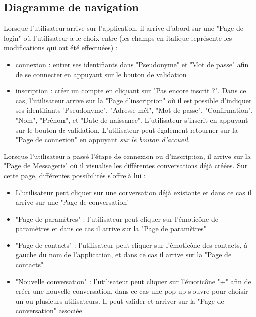 	\newpage

	\subsection{Diagramme de navigation}
	Lorsque l'utilisateur arrive sur l'application, il arrive d'abord sur une "Page de login" où l'utilisateur a le choix entre (les champs en italique représente les modifications qui ont été effectuées) :
	\begin{itemize}
		\item connexion : entrer ses identifiants dans "Pseudonyme" et "Mot de passe" afin de se connecter en appuyant sur le bouton de validation
		\item inscription : créer un compte en cliquant sur "Pas encore inscrit ?".
		Dans ce cas, l'utilisateur arrive sur la "Page d'inscription" où il est possible d'indiquer ses identifiants "Pseudonyme", "Adresse mél", "Mot de passe", "Confirmation", "Nom", "Prénom", et "Date de naissance".
		L'utilisateur s'inscrit en appuyant sur le bouton de validation.
		L'utilisateur peut également retourner sur la "Page de connexion" en appuyant \textit{sur le bouton d'accueil}.\\
	\end{itemize}

	Lorsque l'utilisateur a passé l'étape de connexion ou d'inscription, il arrive sur la "Page de Messagerie" où il visualise les différentes conversations déjà créées. Sur cette page, différentes possibilités s'offre à lui :
	\begin{itemize}
		\item L'utilisateur peut cliquer sur une conversation déjà existante et dans ce cas il arrive sur une "Page de conversation"
		\item "Page de paramètres" : l'utilisateur peut cliquer sur l’émoticône de paramètres et dans ce cas il arrive sur la "Page de paramètres"
		\item "Page de contacts" : l'utilisateur peut cliquer sur l’émoticône des contacts, à gauche du nom de l'application, et dans ce cas il arrive sur la "Page de contacts"
		\item "Nouvelle conversation" : l'utilisateur peut cliquer sur l’émoticône "+" afin de créer une nouvelle conversation, dans ce cas une pop-up s'ouvre pour choisir un ou plusieurs utilisateurs. Il peut valider et arriver sur la "Page de conversation" associée\\
	\end{itemize}

